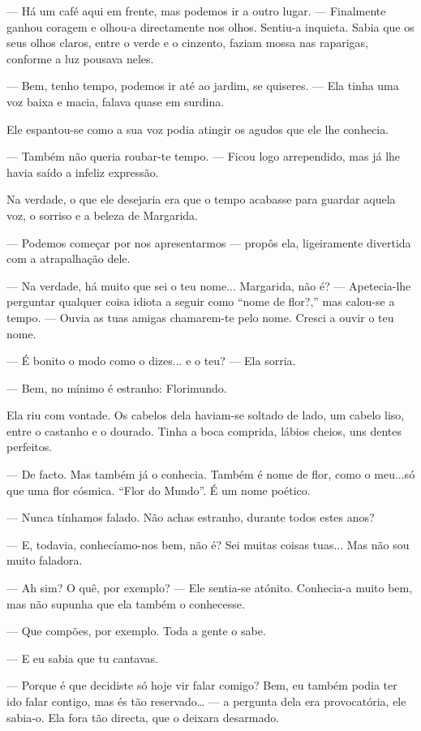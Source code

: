 --- Há um café aqui em frente, mas podemos ir a outro lugar. --- Finalmente
ganhou coragem e olhou-a directamente nos olhos. Sentiu-a inquieta.
Sabia que os seus olhos claros, entre o verde e o cinzento, faziam mossa
nas raparigas, conforme a luz pousava neles.

--- Bem, tenho tempo, podemos ir até ao jardim, se quiseres. --- Ela tinha
uma voz baixa e macia, falava quase em surdina.

Ele espantou-se como a sua voz podia atingir os agudos que ele lhe
conhecia.

--- Também não queria roubar-te tempo. --- Ficou logo arrependido, mas já
lhe havia saído a infeliz expressão.

Na verdade, o que ele desejaria era que o tempo acabasse para guardar
aquela voz, o sorriso e a beleza de Margarida.

--- Podemos começar por nos apresentarmos --- propôs ela, ligeiramente
divertida com a atrapalhação dele.

--- Na verdade, há muito que sei o teu nome... Margarida, não é? ---
Apetecia-lhe perguntar qualquer coisa idiota a seguir como ``nome de
flor?,'' mas calou-se a tempo. --- Ouvia as tuas amigas chamarem-te pelo
nome. Cresci a ouvir o teu nome.

--- É bonito o modo como o dizes... e o teu? --- Ela sorria.

--- Bem, no mínimo é estranho: Florimundo.

Ela riu com vontade. Os cabelos dela haviam-se soltado de lado, um
cabelo liso, entre o castanho e o dourado. Tinha a boca comprida, lábios
cheios, uns dentes perfeitos.

--- De facto. Mas também já o conhecia. Também é nome de flor, como o
meu...só que uma flor cósmica. ``Flor do Mundo''. É um nome poético.

--- Nunca tínhamos falado. Não achas estranho, durante todos estes anos?

--- E, todavia, conhecíamo-nos bem, não é? Sei muitas coisas tuas... Mas
não sou muito faladora.

--- Ah sim? O quê, por exemplo? --- Ele sentia-se atónito. Conhecia-a muito
bem, mas não supunha que ela também o conhecesse.

--- Que compões, por exemplo. Toda a gente o sabe.

--- E eu sabia que tu cantavas.

--- Porque é que decidiste só hoje vir falar comigo? Bem, eu também podia
ter ido falar contigo, mas és tão reservado\ldots{} --- a pergunta dela
era provocatória, ele sabia-o. Ela fora tão directa, que o deixara
desarmado.

